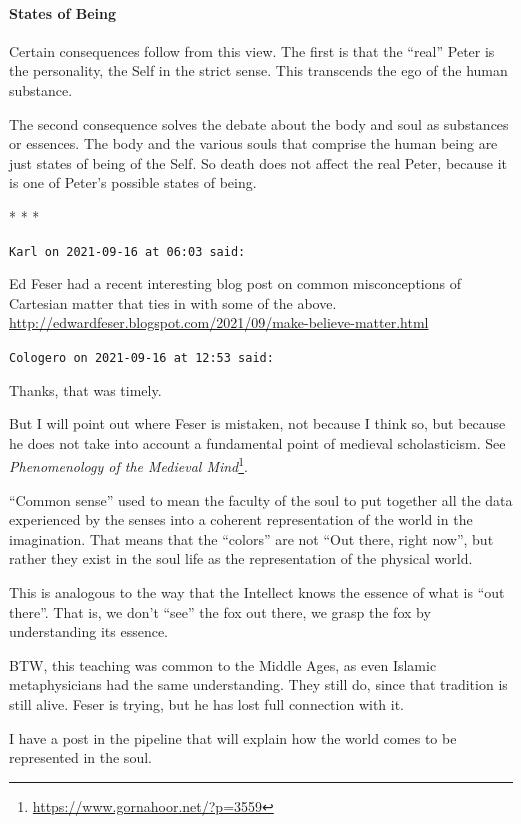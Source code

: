 \paragraph{States of Being}


Certain consequences follow from this view. The first is that the ``real'' Peter is the personality, the Self in the strict sense. This transcends the ego of the human substance.

The second consequence solves the debate about the body and soul as substances or essences. The body and the various souls that comprise the human being are just states of being of the Self. So death does not affect the real Peter, because it is one of Peter's possible states of being.



\begin{center}* * *\end{center}

\begin{footnotesize}
\begin{sffamily}
\texttt{Karl on 2021-09-16 at 06:03 said:}

Ed Feser had a recent interesting blog post on common misconceptions of Cartesian matter that ties in with some of the above.
\url{http://edwardfeser.blogspot.com/2021/09/make-believe-matter.html}


\hfill

\texttt{Cologero on 2021-09-16 at 12:53 said:}

Thanks, that was timely.

But I will point out where Feser is mistaken, not because I think so, but because he does not take into account a fundamental point of medieval scholasticism. See \textit{Phenomenology of the Medieval Mind}\footnote{\url{https://www.gornahoor.net/?p=3559}}.

``Common sense'' used to mean the faculty of the soul to put together all the data experienced by the senses into a coherent representation of the world in the imagination. That means that the ``colors'' are not ``Out there, right now'', but rather they exist in the soul life as the representation of the physical world.

This is analogous to the way that the Intellect knows the essence of what is ``out there''. That is, we don't ``see'' the fox out there, we grasp the fox by understanding its essence.

BTW, this teaching was common to the Middle Ages, as even Islamic metaphysicians had the same understanding. They still do, since that tradition is still alive. Feser is trying, but he has lost full connection with it.

I have a post in the pipeline that will explain how the world comes to be represented in the soul.


\hfill

\end{sffamily}
\end{footnotesize}

